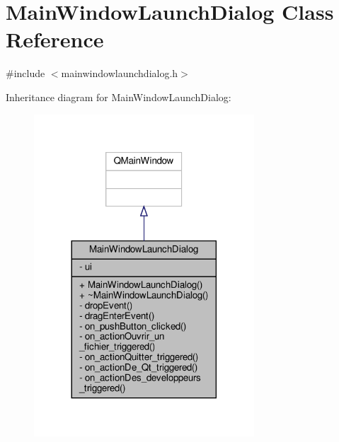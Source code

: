 \hypertarget{classMainWindowLaunchDialog}{}\section{Main\+Window\+Launch\+Dialog Class Reference}
\label{classMainWindowLaunchDialog}


{\ttfamily \#include $<$mainwindowlaunchdialog.\+h$>$}



Inheritance diagram for Main\+Window\+Launch\+Dialog\+:
\nopagebreak
\begin{figure}[H]
\begin{center}
\leavevmode
\includegraphics[width=233pt]{classMainWindowLaunchDialog__inherit__graph}
\end{center}
\end{figure}


